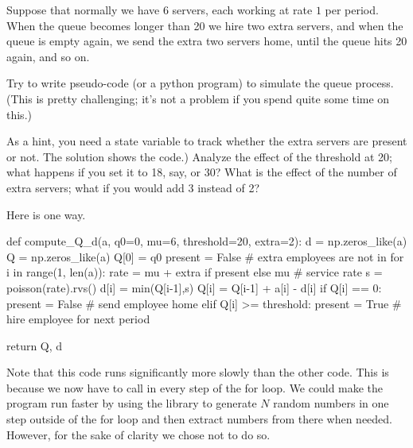 Suppose that normally we have 6 servers, each working at rate $1$ per period.
When the queue becomes longer than 20 we hire two extra servers, and when the queue is empty again, we send the extra two servers home, until the queue hits 20 again, and so on.
\begin{exercise}
  Try to write pseudo-code (or a  python program) to simulate the queue process. (This is pretty challenging; it's not a problem if you spend quite some time on this.)
  \begin{hint}
  As a hint, you need a state variable to track whether the extra servers are present or not. The solution shows the code.) Analyze the effect of the threshold at 20; what happens if you set it to 18, say, or 30? What is the effect of the number of extra servers; what if you would add 3 instead of 2?
  \end{hint}

  \begin{solution}
Here is one way.
    \begin{pyverbatim}
def compute_Q_d(a, q0=0, mu=6, threshold=20, extra=2):
    d = np.zeros_like(a)
    Q = np.zeros_like(a)
    Q[0] = q0
    present = False # extra employees are not in
    for i in range(1, len(a)):
        rate = mu + extra if present else mu # service rate
        s = poisson(rate).rvs()
        d[i] = min(Q[i-1],s)
        Q[i] = Q[i-1] + a[i] - d[i]
        if Q[i] == 0:
            present = False # send employee home
        elif Q[i] >= threshold:
            present = True # hire employee for next period
    
    return Q, d
    
    \end{pyverbatim}

    Note that this code runs significantly more slowly than the other code. This is because  we now  have to call  in every step of the for loop. We could make the program run faster by using the  library to generate $N$ random numbers in one step outside of the for loop and then extract numbers from there when needed. However, for the sake of clarity we chose not to do so.
  \end{solution}
  
\end{exercise}


